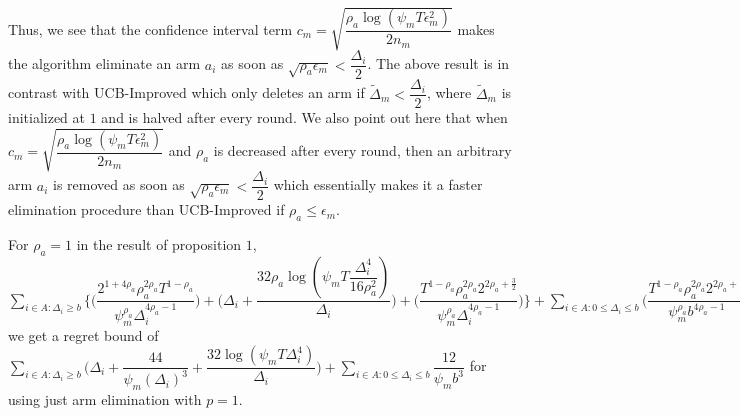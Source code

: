 \paragraph*{} Thus, we see that the confidence interval term $c_{m}=\sqrt{\dfrac{\rho_{a}\log (\psi_{m}T\epsilon_{m}^{2})}{2 n_{m}}}$ makes the algorithm eliminate an arm $a_{i}$ as soon as $\sqrt{\rho_{a}\epsilon_{m}}<\dfrac{\Delta_{i}}{2}$. The above result is in contrast with UCB-Improved which only deletes an arm if $\tilde{\Delta}_{m}<\dfrac{\Delta_{i}}{2}$, where $\tilde{\Delta}_{m}$ is initialized at $1$ and is halved after every round. We also point out here that when $c_{m}=\sqrt{\dfrac{\rho_{a}\log (\psi_{m}T\epsilon_{m}^{2})}{2 n_{m}}}$ and $\rho_{a}$ is decreased after every round, then an arbitrary arm $a_{i}$ is removed as soon as  $\sqrt{\rho_{a}\epsilon_{m}}<\dfrac{\Delta_{i}}{2}$ which essentially makes it a faster elimination procedure than UCB-Improved if $\rho_{a}\leq \epsilon_{m}$.


\begin{corollary}
\label{proofSketch:Corollary:1}
For $\rho_{a}=1$ in the result of proposition $1$, $\sum\limits_{i\in A:\Delta_{i}\geq b}\bigg\lbrace\bigg(\dfrac{2^{1+4\rho_{a}}\rho_{a}^{2\rho_{a}}T^{1-\rho_{a}}}{\psi_{m}^{\rho_{a}}\Delta_{i}^{4\rho_{a}-1}}\bigg) + \bigg(\Delta_{i}+\dfrac{32\rho_{a}\log{(\psi_{m}T\dfrac{\Delta_{i}^{4}}{16\rho_{a}^{2}})}}{\Delta_{i}}\bigg)  +  \bigg(\dfrac{T^{1-\rho_{a}}\rho_{a}^{2\rho_{a}}2^{2\rho_{a}+\frac{3}{2}}}{\psi_{m}^{\rho_{a}}\Delta_{i}^{4\rho_{a} -1}} \bigg) \bigg \rbrace+\sum\limits_{i\in A:0\leq\Delta_{i}\leq b}\bigg(\dfrac{T^{1-\rho_{a}}\rho_{a}^{2\rho_{a}}2^{2\rho_{a}+\frac{3}{2}}}{\psi_{m}^{\rho_{a}}b^{4\rho_{a} -1}} \bigg) + max_{i:\Delta_{i}\leq b}\Delta_{i}T$ we get a regret bound of $\sum\limits_{i\in A:\Delta_{i}\geq b}\bigg(\Delta_{i} + \dfrac{44}{\psi_{m}(\Delta_{i})^{3}} + \dfrac{32\log{(\psi_{m}T\Delta_{i}^{4})}}{\Delta_{i}}\bigg) + \sum\limits_{i\in A:0\leq\Delta_{i}\leq b}\dfrac{12}{\psi_{m}b^{3}}$ for using just arm elimination with $p=1$.
\end{corollary}


